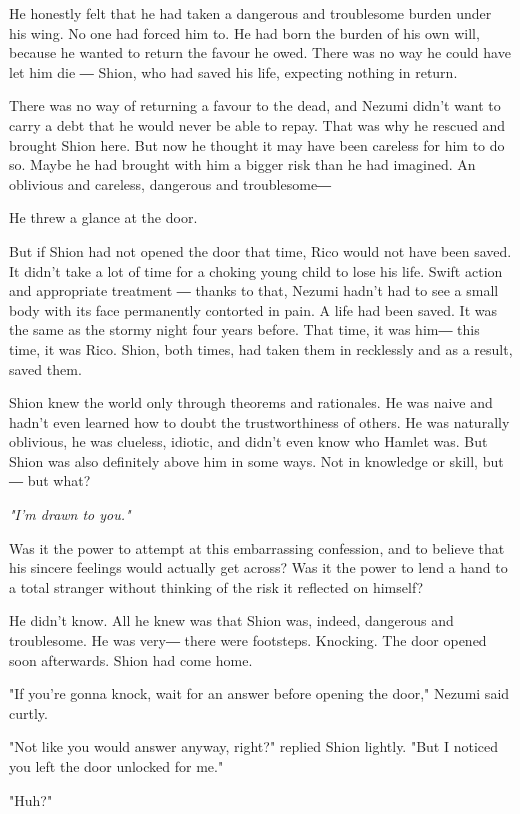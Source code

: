 He honestly felt that he had taken a dangerous and troublesome burden
under his wing. No one had forced him to. He had born the burden of his
own will, because he wanted to return the favour he owed. There was no
way he could have let him die ― Shion, who had saved his life, expecting
nothing in return.

There was no way of returning a favour to the dead, and Nezumi didn't
want to carry a debt that he would never be able to repay. That was why
he rescued and brought Shion here. But now he thought it may have been
careless for him to do so. Maybe he had brought with him a bigger risk
than he had imagined. An oblivious and careless, dangerous and
troublesome―

He threw a glance at the door.

But if Shion had not opened the door that time, Rico would not have been
saved. It didn't take a lot of time for a choking young child to lose
his life. Swift action and appropriate treatment ― thanks to that,
Nezumi hadn't had to see a small body with its face permanently
contorted in pain. A life had been saved. It was the same as the stormy
night four years before. That time, it was him― this time, it was Rico.
Shion, both times, had taken them in recklessly and as a result, saved
them.

Shion knew the world only through theorems and rationales. He was naive
and hadn't even learned how to doubt the trustworthiness of others. He
was naturally oblivious, he was clueless, idiotic, and didn't even know
who Hamlet was. But Shion was also definitely above him in some ways.
Not in knowledge or skill, but ― but what?

\emph{"I'm drawn to you."}

Was it the power to attempt at this embarrassing confession, and to
believe that his sincere feelings would actually get across? Was it the
power to lend a hand to a total stranger without thinking of the risk it
reflected on himself?

He didn't know. All he knew was that Shion was, indeed, dangerous and
troublesome. He was very― there were footsteps. Knocking. The door
opened soon afterwards. Shion had come home.

"If you're gonna knock, wait for an answer before opening the door,"
Nezumi said curtly.

"Not like you would answer anyway, right?" replied Shion lightly. "But I
noticed you left the door unlocked for me."

"Huh?"

